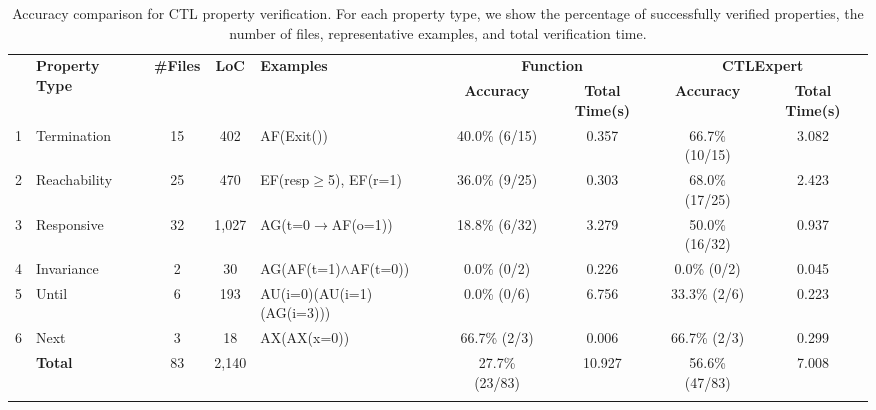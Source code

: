 \begin{table*}[!t]
  \caption{\label{tab:comparewithFuntionT2} 
  {Accuracy comparison for CTL property verification. 
  For each property type, we show the percentage of successfully verified properties, the number of files, representative examples, and total verification time.}
  } 
  \vspace{-1mm}
  \normalsize
  \centering
  \renewcommand{\arraystretch}{0.95}
  \setlength{\tabcolsep}{2.5pt}  %
  \begin{tabular}{c|l|c|c|l|c|c|c|c}
  \Xhline{1.5\arrayrulewidth}
  \multicolumn{1}{l|}{\multirow{2}{*}{\textbf{}}} & \multirow{2}{*}{\textbf{Property Type}} & \multirow{2}{*}{\textbf{\#Files}} & \multirow{2}{*}{\textbf{LoC}} & \multirow{2}{*}{\textbf{Examples}} & \multicolumn{2}{c|}{\textbf{Function}} & \multicolumn{2}{c}{\textbf{CTLExpert}} \\
  \cline{6-9}
  \multicolumn{1}{l|}{} & & & & & \multicolumn{1}{c|}{\textbf{Accuracy}} & \textbf{Total Time(s)} & \multicolumn{1}{c|}{\textbf{Accuracy}} & \textbf{Total Time(s)} \\
  \Xhline{1.5\arrayrulewidth}
  
  1 & Termination & 15 & 402 & AF(Exit()) & \multicolumn{1}{c|}{40.0\% (6/15)} & 0.357 & \multicolumn{1}{c|}{66.7\% (10/15)} & 3.082 \\

  2 & Reachability & 25 & 470 & EF(resp{$\geq$}5), EF(r=1) & \multicolumn{1}{c|}{36.0\% (9/25)} & 0.303 & \multicolumn{1}{c|}{68.0\% (17/25)} & 2.423 \\
  
  3 & Responsive & 32 & 1,027 & AG(t=0{$\rightarrow$}AF(o=1)) & \multicolumn{1}{c|}{18.8\% (6/32)} & 3.279 & \multicolumn{1}{c|}{50.0\% (16/32)} & 0.937 \\
  
  4 & Invariance & 2 & 30 & AG(AF(t=1){$\wedge$}AF(t=0)) & \multicolumn{1}{c|}{0.0\% (0/2)} & 0.226 & \multicolumn{1}{c|}{0.0\% (0/2)} & 0.045 \\
  
  5 & Until & 6 & 193 & AU(i=0)(AU(i=1)(AG(i=3))) & \multicolumn{1}{c|}{0.0\% (0/6)} & 6.756 & \multicolumn{1}{c|}{33.3\% (2/6)} & 0.223 \\
  
  6 & Next & 3 & 18 & AX(AX(x=0)) & \multicolumn{1}{c|}{66.7\% (2/3)} & 0.006 & \multicolumn{1}{c|}{66.7\% (2/3)} & 0.299 \\
  \Xhline{1.5\arrayrulewidth}
  & \textbf{Total} & 83 & 2,140 & & \multicolumn{1}{c|}{27.7\% (23/83)} & 10.927 & \multicolumn{1}{c|}{56.6\% (47/83)} & 7.008 \\
  \Xhline{1.5\arrayrulewidth}
  \end{tabular}
  \vspace{1mm}
\end{table*}


